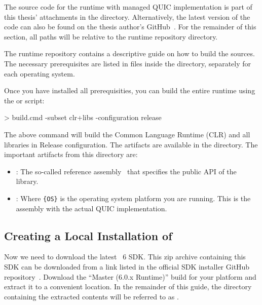 The source code for the \dotnet{} runtime with managed QUIC implementation is part of this thesis'
attachments in the  directory. Alternatively, the latest version of the
code can also be found on the thesis author's GitHub~\cite{githubRzikmRuntimelab}. For the remainder
of this section, all paths will be relative to the \dotnet{} runtime repository directory.

The \dotnet{} runtime repository contains a descriptive guide on how to build the sources. The
necessary prerequisites are listed in files inside the 
directory, separately for each operating system.

Once you have installed all prerequisities, you can build the entire \dotnet{} runtime using the
 or  script:

\begin{myVerbatim}
> build.cmd -subset clr+libs -configuration release
\end{myVerbatim}

The above command will build the Common Language Runtime (CLR) and all libraries in Release
configuration. The artifacts are available in the 
directory. The important artifacts from this directory are:

\begin{itemize}

  \item {}: The so-called reference
assembly~\cite{ReferenceAssemblyDocs} that specifies the public API of the library.

  \item {}: Where \verb|{OS}| is the operating
system platform you are running. This is the \dotnet{} assembly with the actual QUIC implementation.

\end{itemize}

\subsection{Creating a Local Installation of \dotnet{}}\label{sec:06-local-dotnet}

Now we need to download the latest \dotnet{}~6 SDK\@. This zip archive containing this SDK can be
downloaded from a link listed in the official SDK installer GitHub
repository~\cite{dotnetSdkGithub}. Download the ``Master (6.0.x Runtime)'' build for your platform
and extract it to a convenient location. In the remainder of this guide, the directory containing
the extracted contents will be referred to as .

